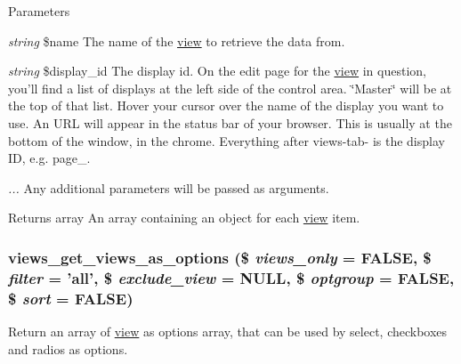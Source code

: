 \begin{DoxyParams}{Parameters}
\item[{\em string}]\$name The name of the \hyperlink{classview}{view} to retrieve the data from. \item[{\em string}]\$display\_\-id The display id. On the edit page for the \hyperlink{classview}{view} in question, you'll find a list of displays at the left side of the control area. \char`\"{}Master\char`\"{} will be at the top of that list. Hover your cursor over the name of the display you want to use. An URL will appear in the status bar of your browser. This is usually at the bottom of the window, in the chrome. Everything after views-\/tab-\/ is the display ID, e.g. page\_. \item[{\em ...}]Any additional parameters will be passed as arguments. \end{DoxyParams}
\begin{DoxyReturn}{Returns}
array An array containing an object for each \hyperlink{classview}{view} item. 
\end{DoxyReturn}
\hypertarget{views_8module_a8a6a958634c7fee2a5ae780bc306295a}{
\subsubsection[{views\_\-get\_\-views\_\-as\_\-options}]{\setlength{\rightskip}{0pt plus 5cm}views\_\-get\_\-views\_\-as\_\-options (\$ {\em views\_\-only} = {\ttfamily FALSE}, \/  \$ {\em filter} = {\ttfamily 'all'}, \/  \$ {\em exclude\_\-view} = {\ttfamily NULL}, \/  \$ {\em optgroup} = {\ttfamily FALSE}, \/  \$ {\em sort} = {\ttfamily FALSE})}}
\label{views_8module_a8a6a958634c7fee2a5ae780bc306295a}
Return an array of \hyperlink{classview}{view} as options array, that can be used by select, checkboxes and radios as options.


